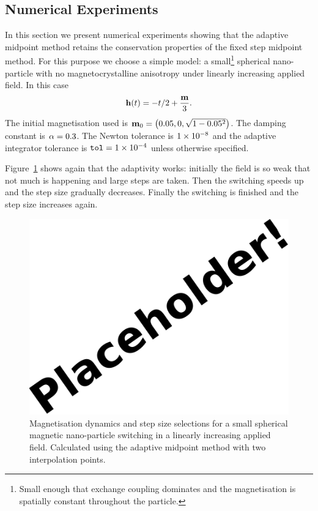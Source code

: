 \subsection{Numerical Experiments}

In this section we present numerical experiments showing that the adaptive midpoint method retains the conservation properties of the fixed step midpoint method.
For this purpose we choose a simple model: a small\footnote{Small enough that exchange coupling dominates and the magnetisation is spatially constant throughout the particle.} spherical nano-particle with no magnetocrystalline anisotropy under linearly increasing applied field.
In this case
\begin{equation}
  \mathbf{h}(t) = - t/2 +  \frac{\mathbf{m}}{3}.
\end{equation}
The initial magnetisation used is $\mathbf{m}_0 = \left( 0.05, 0, \sqrt{1 - 0.05^2} \right)$.
The damping constant is $\alpha = 0.3$.
The Newton tolerance is $1\times 10^{-8}$ and the adaptive integrator tolerance is ${\textrm{\textup{\texttt{tol}}}} = 1\times 10^{-4}$ unless otherwise specified.

Figure~\ref{fig:linear-field-switch-mp} shows again that the adaptivity works: initially the field is so weak that not much is happening and large steps are taken.
Then the switching speeds up and the step size gradually decreases.
Finally the switching is finished and the step size increases again.

\begin{figure}[ht!]
  \centering
  \includegraphics{images/placeholder}
  \caption{Magnetisation dynamics and step size selections for a small spherical magnetic nano-particle switching in a linearly increasing applied field. Calculated using the adaptive midpoint method with two interpolation points.}
  \label{fig:linear-field-switch-mp}
\end{figure}

